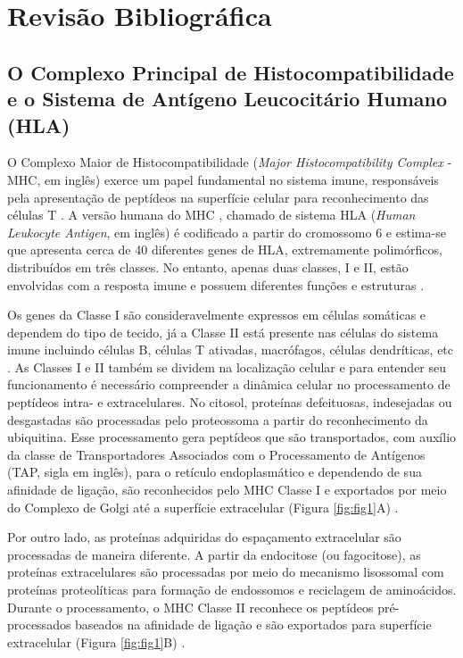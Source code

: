 \chapter{Revisão Bibliográfica}

\begin{justify}

\section{O Complexo Principal de Histocompatibilidade e o Sistema de Antígeno
Leucocitário Humano (HLA)}

O Complexo Maior de Histocompatibilidade (\textit{Major Histocompatibility Complex} - MHC, em inglês) exerce um papel fundamental no sistema imune, responsáveis pela apresentação de peptídeos na superfície celular para reconhecimento das células T \cite{Wieczorek:2017}. A versão humana do MHC , chamado de sistema HLA (\textit{Human Leukocyte Antigen}, em inglês) é codificado a partir do cromossomo 6 e estima-se que apresenta cerca de 40 diferentes genes de HLA, extremamente polimórficos, distribuídos em três classes.  No entanto, apenas duas classes, I e II, estão envolvidas com a resposta imune e possuem diferentes funções e estruturas \cite{Klein:2000}. 

Os genes da Classe I são consideravelmente expressos em células somáticas e dependem do tipo de tecido, já a Classe II está presente nas células do sistema imune incluindo células B, células T ativadas, macrófagos, células dendríticas, etc \cite{Klein:2000, Siegrist:2018}. As Classes I e II também se dividem na localização celular e para entender seu funcionamento é necessário compreender a dinâmica celular no processamento de peptídeos intra- e extracelulares. No citosol, proteínas defeituosas, indesejadas ou desgastadas são processadas pelo proteossoma a partir do reconhecimento da ubiquitina. Esse processamento gera peptídeos que são transportados, com auxílio da classe de Transportadores Associados com o Processamento de Antígenos (TAP, sigla em inglês),  para o retículo endoplasmático e dependendo de sua afinidade de ligação, são reconhecidos pelo MHC Classe I e exportados por meio do Complexo de Golgi até a superfície extracelular (Figura \ref{fig:fig1}A) \cite{Klein:2000}. 

Por outro lado, as proteínas adquiridas do espaçamento extracelular são processadas de maneira diferente. A partir da endocitose (ou fagocitose), as proteínas extracelulares são processadas por meio do mecanismo lisossomal com proteínas proteolíticas para formação de endossomos e reciclagem de aminoácidos. Durante o processamento, o MHC Classe II reconhece os peptídeos pré-processados baseados na afinidade de ligação e são exportados para superfície extracelular (Figura \ref{fig:fig1}B) \cite{Klein:2000}.


\end{justify}
